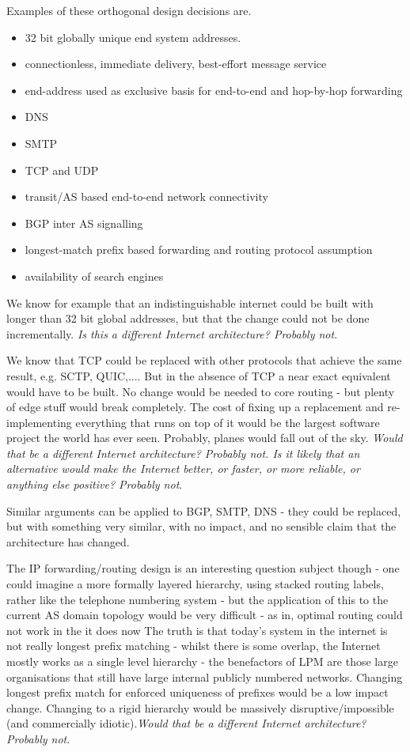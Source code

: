 Examples of these orthogonal design decisions are.

\begin{itemize}
	\item 32 bit globally unique end system addresses.
	\item connectionless, immediate delivery, best-effort message service
	\item end-address used as exclusive basis for end-to-end and hop-by-hop forwarding
	\item DNS
	\item SMTP
	\item TCP and UDP
	\item transit/AS based end-to-end network connectivity
	\item BGP inter AS signalling
	\item longest-match prefix based forwarding and routing protocol assumption
	\item availability of search engines
\end{itemize}
We know for example that an indistinguishable internet could be built with longer than 32 bit global addresses, but that the change could not be done incrementally. \textit{Is this a different Internet architecture? Probably not}.

We know that TCP could be replaced with other protocols that achieve the same result, e.g. SCTP, QUIC,....
But in the absence of TCP a near exact equivalent would have to be built.
No change would be needed to core routing - but plenty of edge stuff would break completely.
The cost of fixing up a replacement and re-implementing everything that runs on top of it would be the largest software project the world has ever seen.
Probably, planes would fall out of the sky.
\textit{Would that be a different Internet architecture? Probably not.
	Is it likely that an alternative would make the Internet better, or faster, or more reliable, or anything else positive? Probably not}.

Similar arguments can be applied to BGP, SMTP, DNS - they could be replaced, but with something very similar, with no impact, and no sensible claim that the architecture has changed.

The IP forwarding/routing design is an interesting question subject though - one could imagine a more formally layered hierarchy, using stacked routing labels, rather like the telephone numbering system - but the application of this to the current AS domain topology would be very difficult - as in, optimal routing could not work in the it does now
The truth is that today's system in the internet is not really longest prefix matching - whilst there is some overlap, the Internet mostly works as a single level hierarchy - the benefactors of LPM are those large organisations that still have large internal publicly numbered networks.
Changing longest prefix match for enforced uniqueness of prefixes would be a low impact change.
Changing to a rigid hierarchy would be massively disruptive/impossible (and commercially idiotic).\textit{Would that be a different Internet architecture? Probably not}.

